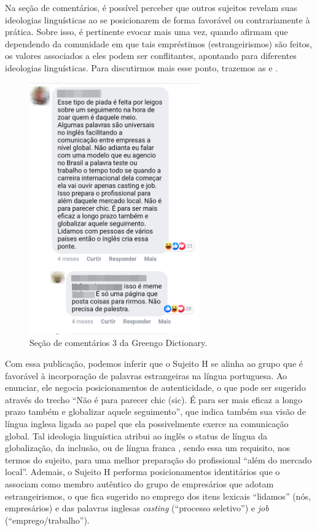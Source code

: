 \documentclass[portuguese]{textolivre}
\begin{document}
Na seção de comentários, é possível perceber que outros sujeitos revelam suas ideologias linguísticas ao se posicionarem de forma favorável ou contrariamente à prática. Sobre isso, é pertinente evocar \textcite{garcez_estrangeirismos:_2001} mais uma vez, quando afirmam que dependendo da comunidade em que tais empréstimos (estrangeirismos) são feitos, os valores associados a eles podem ser conflitantes, apontando para diferentes ideologias linguísticas. Para discutirmos mais esse ponto, trazemos as  e .

\begin{figure}[htbp]
 \centering
 \includegraphics[width=0.65\textwidth]{Fig6.png}
 \caption{Seção de comentários 3 da Greengo Dictionary.}
 \label{fig6}
\end{figure}

Com essa publicação, podemos inferir que o Sujeito H se alinha ao grupo que é favorável à incorporação de palavras estrangeiras na língua portuguesa. Ao enunciar, ele negocia posicionamentos de autenticidade, o que pode ser sugerido através do trecho “Não é para parecer chic (sic). É para ser mais eficaz a longo prazo também e globalizar aquele seguimento”, que indica também sua visão de língua inglesa ligada ao papel que ela possivelmente exerce na comunicação global. Tal ideologia linguística atribui ao inglês o status de língua da globalização, da inclusão, ou de língua franca \cite{seidlhofer_understanding_2011}, sendo essa um requisito, nos termos do sujeito, para uma melhor preparação do profissional “além do mercado local”. Ademais, o Sujeito H performa posicionamentos identitários que o associam como membro autêntico do grupo de empresários que adotam estrangeirismos, o que fica sugerido no emprego dos itens lexicais “lidamos” (nós, empresários) e das palavras inglesas \textit{casting} (“processo seletivo”) e \textit{job} (“emprego/trabalho”).	
\end{document}
